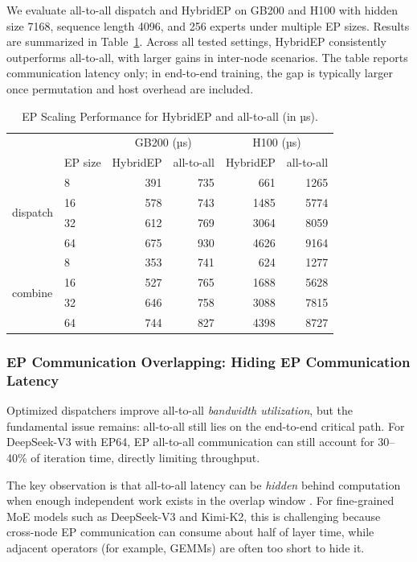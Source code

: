 We evaluate all-to-all dispatch and HybridEP on GB200 and H100 with hidden size 7168, sequence length 4096, and 256 experts under multiple EP sizes. Results are summarized in Table~\ref{tab:hybrid-ep}. Across all tested settings, HybridEP consistently outperforms all-to-all, with larger gains in inter-node scenarios. The table reports communication latency only; in end-to-end training, the gap is typically larger once permutation and host overhead are included.

\begin{table}[ht]
\centering
\caption{EP Scaling Performance for HybridEP and all-to-all (in µs).}
\label{tab:hybrid-ep}
\begin{tabular}{llrrrr}
\toprule
 &  & \multicolumn{2}{c}{GB200 (µs)} & \multicolumn{2}{c}{H100 (µs)} \\
 & EP size & HybridEP & all-to-all & HybridEP & all-to-all \\
\midrule
\multirow{4}{*}{dispatch}
 & 8  & 391 & 735 & 661  & 1265 \\
 & 16 & 578 & 743 & 1485 & 5774 \\
 & 32 & 612 & 769 & 3064 & 8059 \\
 & 64 & 675 & 930 & 4626 & 9164 \\
\midrule
\multirow{4}{*}{combine}
 & 8  & 353 & 741 & 624  & 1277 \\
 & 16 & 527 & 765 & 1688 & 5628 \\
 & 32 & 646 & 758 & 3088 & 7815 \\
 & 64 & 744 & 827 & 4398 & 8727 \\
\bottomrule
\end{tabular}
\end{table}



\subsubsection{EP Communication Overlapping: Hiding EP Communication Latency}\label{sec:comm-overlap}

Optimized dispatchers improve all-to-all \textit{bandwidth utilization}, but the fundamental issue remains: all-to-all still lies on the end-to-end critical path. For DeepSeek-V3 with EP64, EP all-to-all communication can still account for 30--40\% of iteration time, directly limiting throughput.

The key observation is that all-to-all latency can be \textit{hidden} behind computation when enough independent work exists in the overlap window \cite{wang2022coconet,wang2024flux}. For fine-grained MoE models such as DeepSeek-V3 and Kimi-K2, this is challenging because cross-node EP communication can consume about half of layer time, while adjacent operators (for example, GEMMs) are often too short to hide it.

